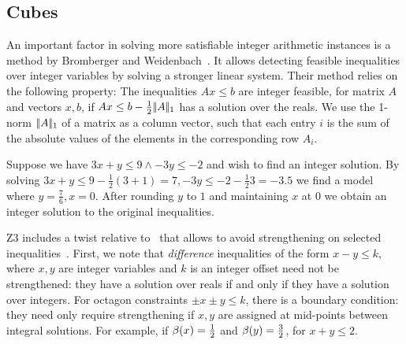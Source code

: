 \subsection{Cubes}
An important factor in solving more satisfiable integer arithmetic instances is
a method by Bromberger and Weidenbach~\cite{BrombergerW16,BrombergerW17}.
It allows detecting feasible inequalities over integer variables 
by solving a stronger linear system.
Their method relies on the following property: The inequalities $Ax \leq b$
are integer feasible, for matrix $A$ and vectors $x, b$, if
$Ax \leq b - \frac{1}{2}|\!|A|\!|_1$ has a solution over the reals.
We use the 1-norm $|\!|A|\!|_1$ of a matrix
as a column vector, such that each entry $i$ is the sum of the absolute
values of the elements in the corresponding row $A_i$.

\begin{example}
Suppose we have $3x + y \leq 9 \wedge - 3y \leq -2$ and wish to find an integer solution. 
By solving $3x + y \leq 9 - \frac{1}{2}(3 + 1) = 7, -3y \leq -2 - \frac{1}{2}3 = -3.5$ we find
a model where $y = \frac{7}{6}, x = 0$. After rounding $y$ to $1$ and maintaining $x$ at $0$ we obtain an
integer solution to the original inequalities.
\end{example}

Z3 includes a twist relative to~\cite{BrombergerW17} that allows to avoid strengthening on selected inequalities~\cite{Vampire17Theorem}.
First, we note that \emph{difference} inequalities of the form $x - y \leq k$, where $x, y$ are integer variables
and $k$ is an integer offset need not be strengthened: they have a solution over reals if and only if they have a solution over integers.
For octagon constraints $\pm x \pm y \leq k$,
there is a boundary condition: they need only require strengthening if $x, y$ are assigned at mid-points
between integral solutions. For example, if $\beta(x) = \frac{1}{2}$ and $\beta(y) = \frac{3}{2}$, for $x + y \leq 2$.


